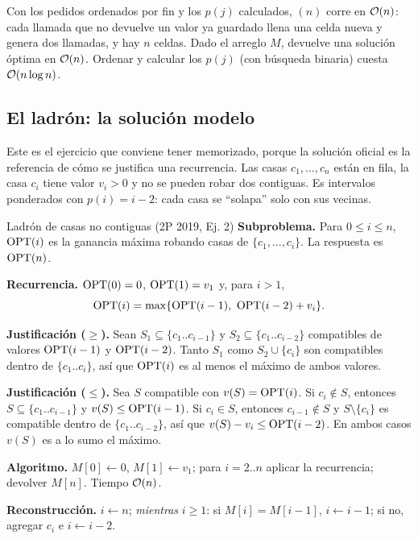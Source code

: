 \begin{resultado}[(6.4) y (6.5)]
Con los pedidos ordenados por fin y los $p(j)$ calculados,
$(n)$ corre en $\mathcal{O}(n)$: cada llamada que no
devuelve un valor ya guardado llena una celda nueva y genera dos llamadas, y
hay $n$ celdas. Dado el arreglo $M$,  devuelve una
solución óptima en $\mathcal{O}(n)$. Ordenar y calcular los $p(j)$ (con búsqueda
binaria) cuesta $\mathcal{O}(n\log n)$.
\end{resultado}

\subsection{El ladrón: la solución modelo}

Este es el ejercicio que conviene tener memorizado, porque la solución
oficial es la referencia de cómo se justifica una recurrencia. Las casas
$c_1,\dots,c_n$ están en fila, la casa $c_i$ tiene valor $v_i>0$ y no se
pueden robar dos contiguas. Es intervalos ponderados con $p(i)=i-2$: cada
casa se ``solapa'' solo con sus vecinas.

\begin{problema}{Ladrón de casas no contiguas (2P 2019, Ej. 2)}
\textbf{Subproblema.} Para $0\le i\le n$, $\mathrm{OPT}(i)$ es la ganancia máxima
robando casas de $\{c_1,\dots,c_i\}$. La respuesta es $\mathrm{OPT}(n)$.

\textbf{Recurrencia.} $\mathrm{OPT}(0)=0$, $\mathrm{OPT}(1)=v_1$ y, para $i>1$,
\[\OPT(i)=\max\{\OPT(i-1),\ \OPT(i-2)+v_i\}.\]

\textbf{Justificación ($\ge$).} Sean $S_1\subseteq\{c_1..c_{i-1}\}$ y
$S_2\subseteq\{c_1..c_{i-2}\}$ compatibles de valores $\mathrm{OPT}(i-1)$ y
$\mathrm{OPT}(i-2)$. Tanto $S_1$ como $S_2\cup\{c_i\}$ son compatibles dentro de
$\{c_1..c_i\}$, así que $\mathrm{OPT}(i)$ es al menos el máximo de ambos valores.

\textbf{Justificación ($\le$).} Sea $S$ compatible con
$v(S)=\mathrm{OPT}(i)$. Si $c_i\notin S$, entonces $S\subseteq\{c_1..c_{i-1}\}$ y
$v(S)\le\mathrm{OPT}(i-1)$. Si $c_i\in S$, entonces $c_{i-1}\notin S$ y
$S\setminus\{c_i\}$ es compatible dentro de $\{c_1..c_{i-2}\}$, así que
$v(S)-v_i\le\mathrm{OPT}(i-2)$. En ambos casos $v(S)$ es a lo sumo el máximo.

\textbf{Algoritmo.} $M[0]\gets0$, $M[1]\gets v_1$; para $i=2..n$ aplicar la
recurrencia; devolver $M[n]$. Tiempo $\mathcal{O}(n)$.

\textbf{Reconstrucción.} $i\gets n$; \emph{mientras} $i\ge1$: si
$M[i]=M[i-1]$, $i\gets i-1$; si no, agregar $c_i$ e $i\gets i-2$.
\end{problema}

